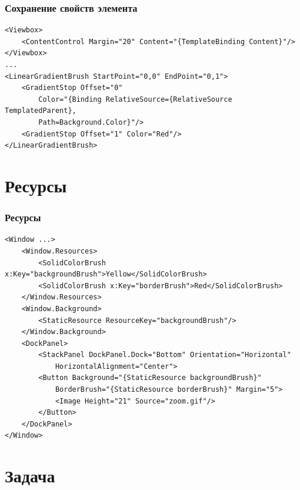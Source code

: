 \documentclass[xetex,mathserif,serif]{beamer}
\begin{document}
	\begin{frame}[fragile]
		\frametitle{Сохранение свойств элемента}
		\begin{scriptsize}
			\begin{verbatim}
<Viewbox>
    <ContentControl Margin="20" Content="{TemplateBinding Content}"/>
</Viewbox>
...
<LinearGradientBrush StartPoint="0,0" EndPoint="0,1">
    <GradientStop Offset="0"
        Color="{Binding RelativeSource={RelativeSource TemplatedParent},
        Path=Background.Color}"/>
    <GradientStop Offset="1" Color="Red"/>
</LinearGradientBrush>
			\end{verbatim}
		\end{scriptsize}
	\end{frame}

	\section{Ресурсы}

	\begin{frame}[fragile]
		\frametitle{Ресурсы}
		\begin{scriptsize}
			\begin{verbatim}
<Window ...>
    <Window.Resources>
        <SolidColorBrush x:Key="backgroundBrush">Yellow</SolidColorBrush>
        <SolidColorBrush x:Key="borderBrush">Red</SolidColorBrush>
    </Window.Resources>
    <Window.Background>
        <StaticResource ResourceKey="backgroundBrush"/>
    </Window.Background>
    <DockPanel>
        <StackPanel DockPanel.Dock="Bottom" Orientation="Horizontal"
            HorizontalAlignment="Center">
        <Button Background="{StaticResource backgroundBrush}"
            BorderBrush="{StaticResource borderBrush}" Margin="5">
            <Image Height="21" Source="zoom.gif"/>
        </Button>
    </DockPanel>
</Window>
			\end{verbatim}
		\end{scriptsize}
	\end{frame}

	\section{Задача}
\end{document}
